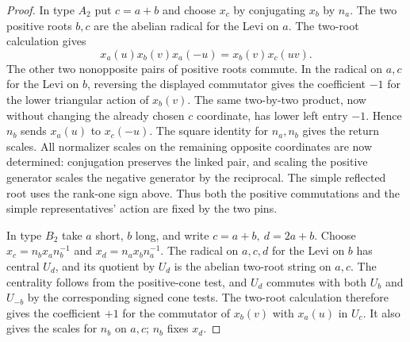 \documentclass[11pt,a4paper,openany,oneside]{book}
\theoremstyle{resultstyle}
\theoremstyle{definition}
\numberwithin{equation}{chapter}
\begin{document}
\begin{proof}
In type \(A_2\) put \(c=a+b\) and choose \(x_c\) by
conjugating \(x_b\) by \(n_a\). The two positive roots \(b,c\)
are the abelian radical for the Levi on \(a\). The two-root
calculation gives
\[
 x_a(u)x_b(v)x_a(-u)=x_b(v)x_c(uv).
\]
The other two nonopposite pairs of positive roots commute.
In the radical on \(a,c\) for the Levi on \(b\), reversing
the displayed commutator gives the coefficient \(-1\) for
the lower triangular action of \(x_b(v)\). The same
two-by-two product, now without changing the already
chosen \(c\) coordinate, has lower left entry \(-1\).
Hence \(n_b\) sends \(x_a(u)\) to \(x_c(-u)\).
The square identity for \(n_a,n_b\) gives the return scales.
All normalizer scales on the remaining opposite coordinates
are now determined: conjugation preserves the linked pair,
and scaling the positive generator scales the negative
generator by the reciprocal. The simple reflected root
uses the rank-one sign above. Thus both the positive
commutations and the simple representatives' action are fixed
by the two pins.

In type \(B_2\) take \(a\) short, \(b\) long, and write
\(c=a+b,\ d=2a+b\). Choose \(x_c=n_b x_a n_b^{-1}\)
and \(x_d=n_a x_b n_a^{-1}\). The radical on \(a,c,d\)
for the Levi on \(b\) has central \(U_d\), and its
quotient by \(U_d\) is the abelian two-root string on
\(a,c\). The centrality follows from the positive-cone
test, and \(U_d\) commutes with both \(U_b\) and \(U_{-b}\)
by the corresponding signed cone tests. The two-root
calculation therefore gives the coefficient \(+1\) for
the commutator of \(x_b(v)\) with \(x_a(u)\) in \(U_c\).
It also gives the scales for \(n_b\) on \(a,c\); \(n_b\)
fixes \(x_d\).


\end{proof}
\end{document}
